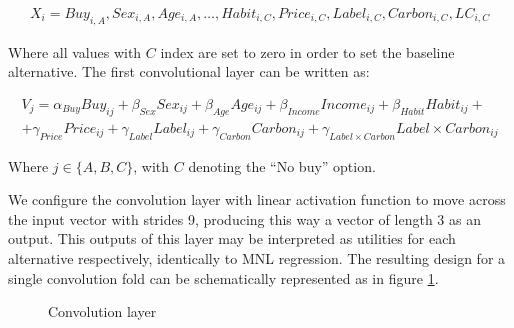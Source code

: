 \documentclass[11pt,]{article}
\begin{document}
\begin{multline}
X_i = Buy_{i,A}, Sex_{i,A}, Age_{i,A}, \dots, Habit_{i,C}, Price_{i,C}, Label_{i,C}, Carbon_{i,C}, LC_{i,C}
\end{multline}

Where all values with \(C\) index are set to zero in order to set the
baseline alternative. The first convolutional layer can be written as:

\begin{multline}
V_j = \alpha_{Buy} Buy_{ij} + \beta_{Sex} Sex_{ij} + \beta_{Age} Age_{ij} + \beta_{Income} Income_{ij} + \beta_{Habit} Habit_{ij} + \\
+ \gamma_{Price} Price_{ij} + \gamma_{Label} Label_{ij} + \gamma_{Carbon} Carbon_{ij} + \gamma_{Label \times Carbon} Label \times Carbon_{ij}
\end{multline}

Where \(j \in \{A, B, C\}\), with \(C\) denoting the ``No buy'' option.

We configure the convolution layer with linear activation function to
move across the input vector with strides 9, producing this way a vector
of length 3 as an output. This outputs of this layer may be interpreted
as utilities for each alternative respectively, identically to MNL
regression. The resulting design for a single convolution fold can be
schematically represented as in figure \ref{fig:convl}.

\begin{figure}[!htbp] \centering 
 \caption{Convolution layer} 
 \label{fig:convl} 
\end{figure}
\end{document}
